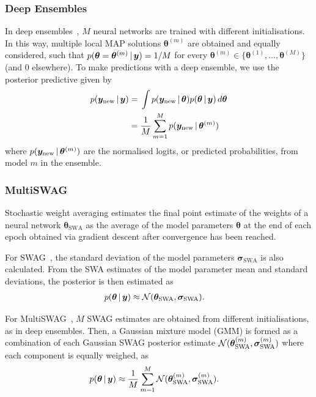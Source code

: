 \documentclass[10pt,a4paper,twocolumn]{article}
\begin{document}
\subsubsection{Deep Ensembles}

In deep ensembles~\cite{lakshminarayanan2017simple}, \(M\) neural networks are trained with different initialisations.
In this way, multiple local MAP solutions \(\bm\theta^{(m)}\) are obtained and equally considered, such that \(p(\bm \theta = \bm \theta^{(m)} \, | \, \bm y) = 1 / M\) for every \(\bm \theta^{(m)} \in \{\bm\theta^{(1)}, \ldots, \bm\theta^{(M)}\}\) (and 0 elsewhere).
To make predictions with a deep ensemble, we use the posterior predictive given by
\begin{align}
    p(\bm y_{\mathrm{new}} \, | \, \bm y)
    ={} & \int p(\bm y_{\mathrm{new}} \, | \, \bm \theta) p(\bm \theta \, | \, \bm y)\,d\bm\theta \nonumber \\
    ={} & \frac{1}{M} \sum_{m=1}^M p(\bm y_{\mathrm{new}} \, | \, \bm\theta^{(m)})
\end{align}
where \(p(\bm y_{\mathrm{new}} \, | \, \bm\theta^{(m)})\) are the normalised logits, or predicted probabilities, from model \(m\) in the ensemble.

\subsubsection{MultiSWAG}

Stochastic weight averaging estimates the final point estimate of the weights of a neural network \(\bm \theta_\mathrm{SWA}\) as the average of the model parameters \(\bm \theta\) at the end of each epoch obtained via gradient descent after convergence has been reached.

For SWAG~\cite{maddox2019simple}, the standard deviation of the model parameters \(\bm \sigma_\mathrm{SWA}\) is also calculated.
From the SWA estimates of the model parameter mean and standard deviations, the posterior is then estimated as
\begin{align}\label{eq:swag}
    p(\bm \theta \, | \, \bm y) \approx{} & \mathcal{N}(\bm \theta_\mathrm{SWA}, \bm \sigma_\mathrm{SWA}).
\end{align}

For MultiSWAG~\cite{wilson2020bayesian}, \(M\) SWAG estimates are obtained from different initialisations, as in deep ensembles.
Then, a Gaussian mixture model (GMM) is formed as a combination of each Gaussian SWAG posterior estimate \(\mathcal{N}(\bm \theta_\mathrm{SWA}^{(m)}, \bm \sigma_\mathrm{SWA}^{(m)})\) where each component is equally weighed, as
\begin{align}\label{eq:multiswag}
    p(\bm \theta \, | \, \bm y) \approx{} & \frac{1}{M} \sum_{m=1}^M \mathcal{N}(\bm \theta_\mathrm{SWA}^{(m)}, \bm \sigma_\mathrm{SWA}^{(m)}).
\end{align}
\end{document}
